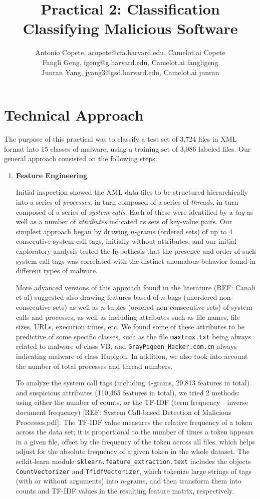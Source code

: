 \documentclass[11pt]{article}
\title{Practical 2: Classification\\ Classifying Malicious Software}
\author{Antonio Copete, acopete@cfa.harvard.edu, Camelot.ai Copete \\
	Fangli Geng, fgeng@g.harvard.edu, Camelot.ai fangligeng\\
	Junran Yang, jyang3@gsd.harvard.edu, Camelot.ai junran}
\begin{document}
\maketitle{}


\section{Technical Approach}

The purpose of this practical was to classify a test set of 3,724 files in XML format into 15 classes of malware, using a training set of 3,086 labeled files. Our general approach consisted on the following steps:

\begin{enumerate}
\item \textbf{Feature Engineering}

Initial inspection showed the XML data files to be structured hierarchically into a series of \emph{processes}, in turn composed of a series of \emph{threads}, in turn composed of a series of \emph{system calls}. Each of these were identified by a \emph{tag} as well as a number of \emph{attributes} indicated as sets of key-value pairs. Our simplest approach began by drawing $n$-grams (ordered sets) of up to 4 consecutive system call tags, initially without attributes, and our initial exploratory analysis tested the hypothesis that the presence and order of such system call tags was correlated with the distinct anomalous behavior found in different types of malware.

More advanced versions of this approach found in the literature (REF: Canali et al) suggested also drawing features based of $n$-bags (unordered non-consecutive sets) as well as $n$-tuples (ordered non-consecutive sets) of system calls and processes, as well as including attributes such as file names, file sizes, URLs, execution times, etc. We found some of these attributes to be predictive of some specific classes, such as the file \verb|maxtrox.txt| being always related to malware of class VB, and \verb|GrayPigeon_Hacker.com.cn| always indicating malware of class Hupigon. In addition, we also took into account the number of total processes and thread numbers.

To analyze the system call tags (including 4-grams, 29,813 features in total) and suspicious attributes (110,465 features in total), we tried 2 methods: using either the number of counts, or the TF-IDF (term frequency---inverse document frequency) [REF: System Call-based Detection of Malicious Processes.pdf]. The TF-IDF value measures the relative frequency of a token across the data set; it is proportional to the number of times a token appears in a given file, offset by the frequency of the token across all files, which helps adjust for the absolute frequency of a given token in the whole dataset. The scikit-learn module \verb|sklearn.feature_extraction.text| includes the objects \verb|CountVectorizer| and \verb|TfidfVectorizer|, which tokenize large strings of tags (with or without arguments) into $n$-grams, and then transform them into counts and TF-IDF values in the resulting feature matrix, respectively.



\end{enumerate}
\end{document}
